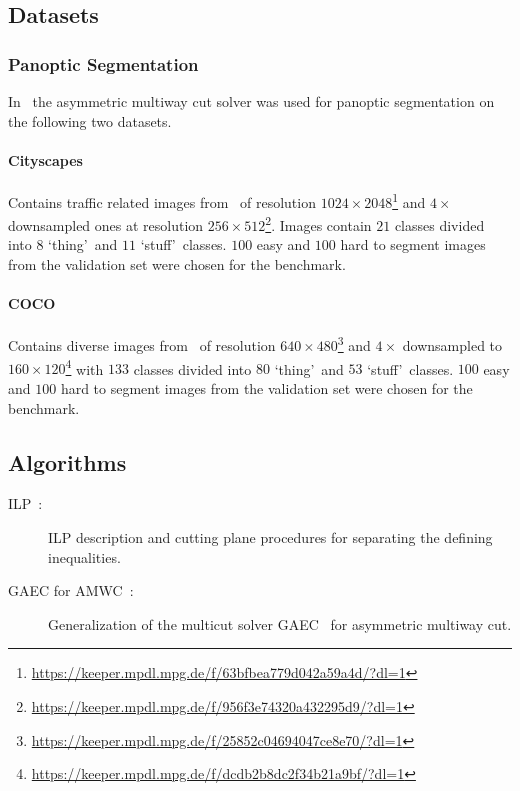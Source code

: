 \subsection{Datasets}

\subsubsection{Panoptic Segmentation}
In~\cite{abbas2021combinatorial} the asymmetric multiway cut solver was used for panoptic segmentation on the following two datasets.

\paragraph{Cityscapes}
Contains traffic related images from~\cite{cordts2016cityscapes} of resolution $1024 \times 2048$\footnote{\url{https://keeper.mpdl.mpg.de/f/63bfbea779d042a59a4d/?dl=1}} and $4 \times$ downsampled ones at resolution $256 \times 512$\footnote{\url{https://keeper.mpdl.mpg.de/f/956f3e74320a432295d9/?dl=1}}.
Images contain $21$ classes divided into $8$ \lq thing\rq\ and $11$ \lq stuff\rq\ classes.
$100$ easy and $100$ hard to segment images from the validation set were chosen for the benchmark. 

\paragraph{COCO}
Contains diverse images from~\cite{lin2014microsoft} of resolution $640 \times 480$\footnote{\url{https://keeper.mpdl.mpg.de/f/25852c04694047ce8e70/?dl=1}} and $4 \times$ downsampled to $160 \times 120$\footnote{\url{https://keeper.mpdl.mpg.de/f/dcdb2b8dc2f34b21a9bf/?dl=1}} with $133$ classes divided into $80$ \lq thing\rq\ and $53$ \lq stuff\rq\ classes.
$100$ easy and $100$ hard to segment images from the validation set were chosen for the benchmark. 

\subsection{Algorithms}
\begin{description}
\item[ILP~\cite{kroeger2014asymmetric}:] ILP description and cutting plane procedures for separating the defining inequalities.
\item[GAEC for AMWC~\cite{abbas2021combinatorial}:] Generalization of the multicut solver GAEC~\cite{keuper2015efficient} for asymmetric multiway cut.
\end{description}
